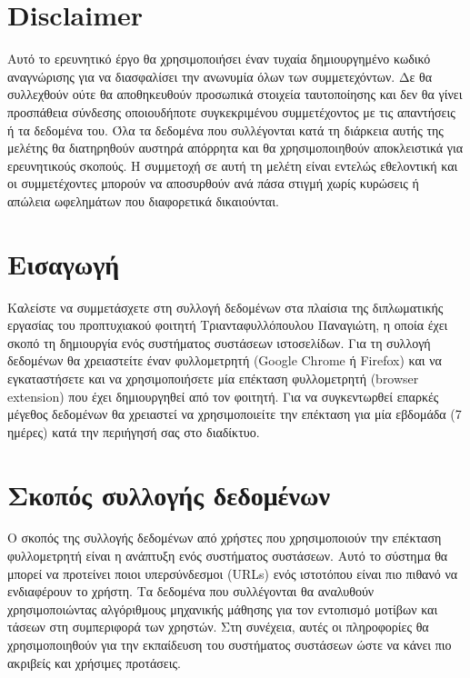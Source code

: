 \documentclass{article}
\begin{document}
\tableofcontents
\thispagestyle{empty}
\cleardoublepage

\setcounter{page}{1}
\section*{Disclaimer}

 Αυτό το ερευνητικό έργο θα χρησιμοποιήσει έναν τυχαία δημιουργημένο κωδικό αναγνώρισης για να διασφαλίσει την ανωνυμία όλων των συμμετεχόντων. Δε θα συλλεχθούν ούτε θα αποθηκευθούν προσωπικά στοιχεία ταυτοποίησης και δεν θα γίνει προσπάθεια σύνδεσης οποιουδήποτε συγκεκριμένου συμμετέχοντος με τις απαντήσεις ή τα δεδομένα του. Όλα τα δεδομένα που συλλέγονται κατά τη διάρκεια αυτής της μελέτης θα διατηρηθούν αυστηρά απόρρητα και θα χρησιμοποιηθούν αποκλειστικά για ερευνητικούς σκοπούς. Η συμμετοχή σε αυτή τη μελέτη είναι εντελώς εθελοντική και οι συμμετέχοντες μπορούν να αποσυρθούν ανά πάσα στιγμή χωρίς κυρώσεις ή απώλεια ωφελημάτων που διαφορετικά δικαιούνται.

\section*{Εισαγωγή}

Καλείστε να συμμετάσχετε στη συλλογή δεδομένων στα πλαίσια της διπλωματικής εργασίας του προπτυχιακού φοιτητή Τριανταφυλλόπουλου Παναγιώτη, η οποία έχει σκοπό τη δημιουργία ενός συστήματος συστάσεων ιστοσελίδων. Για τη συλλογή δεδομένων θα χρειαστείτε έναν φυλλομετρητή (Google Chrome ή Firefox) και να εγκαταστήσετε και να χρησιμοποιήσετε μία επέκταση φυλλομετρητή (browser extension) που έχει δημιουργηθεί από τον φοιτητή. Για να συγκεντωρθεί επαρκές μέγεθος δεδομένων θα χρειαστεί να χρησιμοποιείτε την επέκταση για μία εβδομάδα (7 ημέρες) κατά την περιήγησή σας στο διαδίκτυο.

\section*{Σκοπός συλλογής δεδομένων}

Ο σκοπός της συλλογής δεδομένων από χρήστες που χρησιμοποιούν την επέκταση φυλλομετρητή είναι η ανάπτυξη ενός συστήματος συστάσεων. Αυτό το σύστημα θα μπορεί να προτείνει ποιοι υπερσύνδεσμοι (URLs) ενός ιστοτόπου είναι πιο πιθανό να ενδιαφέρουν το χρήστη. Τα δεδομένα που συλλέγονται θα αναλυθούν χρησιμοποιώντας αλγόριθμους μηχανικής μάθησης για τον εντοπισμό μοτίβων και τάσεων στη συμπεριφορά των χρηστών. Στη συνέχεια, αυτές οι πληροφορίες θα χρησιμοποιηθούν για την εκπαίδευση του συστήματος συστάσεων ώστε να κάνει πιο ακριβείς και χρήσιμες προτάσεις.
\end{document}
